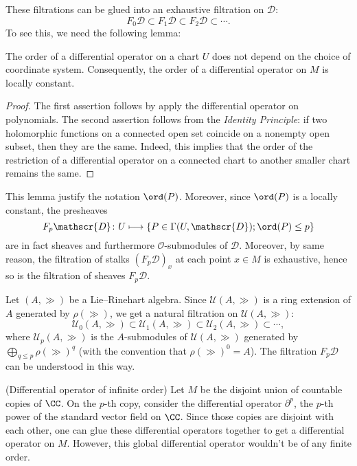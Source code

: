 These filtrations can be glued into an exhaustive filtration on $\mathscr{D}$:
\[
F_0\mathscr{D}\subset F_1\mathscr{D}\subset F_2\mathscr{D}\subset\cdots.
\]
To see this, we need the following lemma:
\begin{lem}
The order of a differential operator on a chart $U$ does not depend on 
the choice of coordinate system. Consequently, 
the order of a differential operator on $M$ is locally constant.
\end{lem}
\begin{proof}
The first assertion follows by apply the differential operator on polynomials. 
The second assertion follows from the \emph{Identity Principle}: 
if two holomorphic functions on a connected open set coincide 
on a nonempty open subset, then they are the same. 
Indeed, this implies that the order of the restriction 
of a differential operator on a connected chart 
to another smaller chart remains the same. 
\end{proof}
This lemma justify the notation $\ord(P)$. 
Moreover, since $\ord(P)$ is a locally constant, the presheaves
\[
F_p\mathscr{D}\colon 
U\longmapsto\{P\in\Gamma(U,\mathscr{D});\ord(P)\le p\}
\]
are in fact sheaves and furthermore $\mathscr{O}$-submodules of $\mathscr{D}$. 
Moreover, by same reason, the filtration of stalks $(F_p\mathscr{D})_x$ 
at each point $x\in M$ is exhaustive, 
hence so is the filtration of sheaves $F_p\mathscr{D}$.

\begin{Rem}
\small
Let $(A,\gg)$ be a Lie–Rinehart algebra. 
Since $\mathcal{U}(A,\gg)$ is a ring extension of $A$ generated by $\rho(\gg)$, 
we get a natural filtration on $\mathcal{U}(A,\gg)$:
\[
\mathcal{U}_0(A,\gg)\subset\mathcal{U}_1(A,\gg)\subset\mathcal{U}_2(A,\gg)
\subset\cdots,
\]
where $\mathcal{U}_p(A,\gg)$ is the $A$-submodules of $\mathcal{U}(A,\gg)$ 
generated by $\bigoplus_{q\le p}\rho(\gg)^q$ 
(with the convention that $\rho(\gg)^0=A$). 
The filtration $F_p\mathscr{D}$ can be understood in this way.
\end{Rem}

\begin{Eg}(Differential operator of infinite order)
Let $M$ be the disjoint union of countable copies of $\CC$.
On the $p$-th copy, consider the differential operator $\partial^p$, 
the $p$-th power of the standard vector field on $\CC$. 
Since those copies are disjoint with each other, 
one can glue these differential operators together 
to get a differential operator on $M$. 
However, this global differential operator wouldn't be of any finite order.
\end{Eg}

